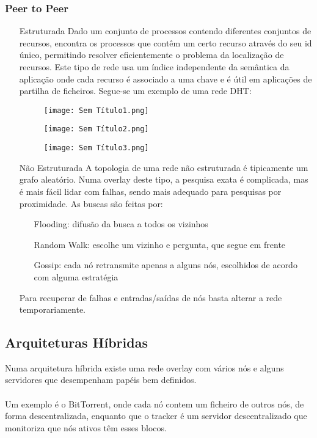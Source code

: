 \documentclass[10pt,a4paper]{report}
\begin{document}
\subsubsection{Peer to Peer}
\begin{itemize}
\item[Estruturada] Dado um conjunto de processos contendo diferentes conjuntos de recursos, encontra os processos que contêm um certo recurso através do seu id único, permitindo resolver eficientemente o problema da localização de recursos. Este tipo de rede usa um índice independente da semântica da aplicação onde cada recurso é associado a uma chave e é útil em aplicações de partilha de ficheiros.   Segue-se um exemplo de uma rede DHT:
\begin{figure}[H]
\centering
\texttt{[image: Sem Título1.png]}
\end{figure}
\begin{figure}[H]
\centering
\texttt{[image: Sem Título2.png]}
\end{figure}
\begin{figure}[H]
\centering
\texttt{[image: Sem Título3.png]}
\end{figure}
\item[Não Estruturada] A topologia de uma rede não estruturada é tipicamente um grafo aleatório. Numa overlay deste tipo, a pesquisa exata é complicada, mas é mais fácil lidar com falhas, sendo mais adequado para pesquisas por proximidade. As buscas são feitas por:
\begin{itemize}
\item[Flooding:] difusão da busca a todos os vizinhos
\item[Random Walk:] escolhe um vizinho e pergunta, que segue em frente
\item[Gossip:] cada nó retransmite apenas a alguns nós, escolhidos de acordo com alguma estratégia
\end{itemize}
Para recuperar de falhas e entradas/saídas de nós basta alterar a rede temporariamente.
\end{itemize}
\subsection{Arquiteturas Híbridas}
Numa arquitetura híbrida existe uma rede overlay com vários nós e alguns servidores que desempenham papéis bem definidos.\\
\\
Um exemplo é o BitTorrent, onde cada nó contem um ficheiro de outros nós, de forma descentralizada, enquanto que o tracker é um servidor descentralizado que monitoriza que nós ativos têm esses blocos.
\end{document}
